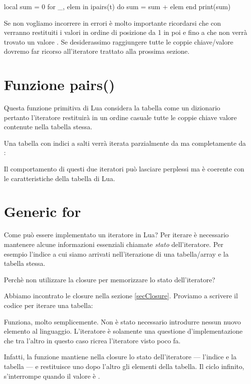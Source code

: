 local sum = 0
for _, elem in ipairs(t) do
    sum = sum + elem
end
print(sum)
\endlines
{}

Se non vogliamo incorrere in errori è molto importante ricordarsi che con
 verranno restituiti i valori in ordine di posizione da 1 in poi e
fino a che non verrà trovato un valore . Se desiderassimo raggiungere
tutte le coppie chiave/valore dovremo far ricorso all'iteratore 
trattato alla prossima sezione.


\section{Funzione pairs()}

Questa funzione primitiva di Lua considera la tabella come un dizionario
pertanto l'iteratore restituirà in un ordine casuale tutte le coppie chiave
valore contenute nella tabella stessa.

Una tabella con indici a salti verrà iterata parzialmente da  ma
completamente da :

Il comportamento di questi due iteratori può lasciare perplessi ma è coerente
con le caratteristiche della tabella di Lua.


\section{Generic for}

Come può essere implementato un iteratore in Lua? Per iterare è necessario
mantenere alcune informazioni essenziali chiamate \emph{stato} dell'iteratore.
Per esempio l'indice a cui siamo arrivati nell'iterazione di una tabella/array
e la tabella stessa.

Perchè non utilizzare la closure per memorizzare lo stato dell'iteratore?

Abbiamo incontrato le closure nella sezione \ref{secClosure}. Proviamo a
scrivere il codice per iterare una tabella:

Funziona, molto semplicemente. Non è stato necessario introdurre nessun nuovo
elemento al linguaggio. L'iteratore è solamente una questione d'implementazione
che tra l'altro in questo caso ricrea l'iteratore  visto poco fa.

Infatti, la funzione  mantiene nella closure lo stato
dell'iteratore --- l'indice  e la tabella  --- e restituisce uno
dopo l'altro gli elementi della tabella. Il ciclo  infinito,
s'interrompe quando il valore è .

